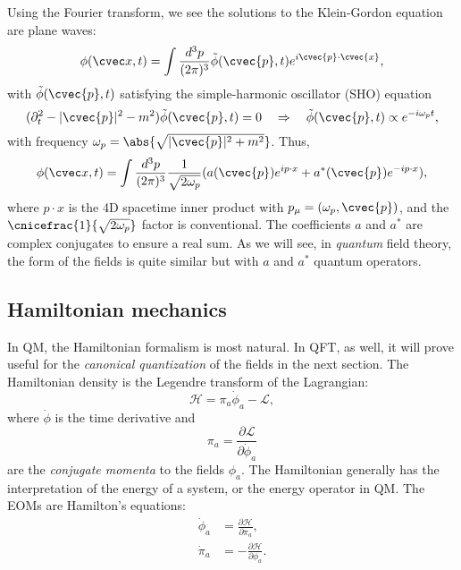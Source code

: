 Using the Fourier transform, we see the solutions to the Klein-Gordon equation are plane waves:
\begin{equation}
	\label{eq:01_qft_field_kg_solutions}
	\phi(\cvec x, t) = \int \frac{d^3p}{(2\pi)^3} \tilde \phi(\cvec{p}, t) e^{i\cvec{p}\cdot\cvec{x}},
\end{equation}
with $\tilde \phi(\cvec{p}, t)$ satisfying the simple-harmonic oscillator (SHO) equation
\begin{equation}
	\label{eq:01_qft_field_kg_sho}
	(\partial_t^2 - |\cvec{p}|^2 - m^2)\tilde \phi(\cvec{p}, t) = 0 \quad \Rightarrow \quad \tilde \phi(\cvec{p}, t) \propto e^{-i\omega_p t},
\end{equation}
with frequency $\omega_p = \abs{\sqrt{|\cvec{p}|^2 + m^2}}$.
Thus,
\begin{equation}
	\label{eq:01_qft_field_kg_solutions_final}
	\phi(\cvec x, t) = \int \frac{d^3p}{(2\pi)^3} \frac{1}{\sqrt{2\omega_p}} (a(\cvec{p})e^{ip\cdot x} + a^*(\cvec{p})e^{-ip\cdot x}),
\end{equation}
where $p\cdot x$ is the 4D spacetime inner product with $p_\mu = (\omega_p, \cvec{p})$, and the $\cnicefrac{1}{\sqrt{2\omega_p}}$ factor is conventional.
The coefficients $a$ and $a^*$ are complex conjugates to ensure a real sum.
As we will see, in \textit{quantum} field theory, the form of the fields is quite similar but with $a$ and $a^*$ quantum operators.


\subsection{Hamiltonian mechanics}

In QM, the Hamiltonian formalism is most natural.
In QFT, as well, it will prove useful for the \textit{canonical quantization} of the fields in the next section.
The Hamiltonian density is the Legendre transform of the Lagrangian:
\begin{equation}
	\label{eq:01_qft_hamiltonian}
	\mathcal H = \pi_a\dot\phi_a - \mathcal{L},
\end{equation}
where $\dot\phi$ is the time derivative and
\begin{equation}
	\label{eq:01_qft_hamiltonian_momenta}
	\pi_a = \frac{\partial\mathcal L}{\partial\dot\phi_a}
\end{equation}
are the \textit{conjugate momenta} to the fields $\phi_a$.
The Hamiltonian generally has the interpretation of the energy of a system, or the energy operator in QM.
The EOMs are Hamilton's equations:
\begin{equation}
	\label{eq:01_qft_hamiltonian_eoms}
	\begin{split}
		\dot\phi_a &= \frac{\partial\mathcal H}{\partial\pi_a}, \\
		\dot\pi_a &= -\frac{\partial\mathcal H}{\partial\phi_a}.
	\end{split}
\end{equation}

